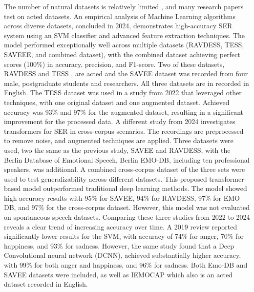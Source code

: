 The number of natural datasets is relatively limited \autocite{Cai2023}, and many research papers test on acted datasets. An empirical analysis \autocite{Ahammed2024} of Machine Learning algorithms across diverse datasets, concluded in 2024, demonstrates high-accuracy SER system using an SVM classifier and advanced feature extraction techniques. The model performed exceptionally well across multiple datasets (RAVDESS, TESS, SAVEEE, and combined dataset), with the combined dataset achieving perfect scores (100\%) in accuracy, precision, and F1-score. Two of these datasets, RAVDESS \autocite{StevenRLivingstone2019} and TESS \autocite{Pichora-Fuller2020}, are acted and the SAVEE \autocite{kaggle-savee} dataset was recorded from four male, postgraduate students and researchers. All three datasets are in recorded in English. 
The TESS dataset was used in a study from 2022 \autocite{Praseetha2022} that leveraged other techniques, with one original dataset and one augmented dataset. Achieved accuracy was 93\% and 97\% for the augmented dataset, resulting in a significant improvement for the processed data.
A different study \autocite{Alroobaea2024} from 2024 investigates transformers for SER in cross-corpus scenarios. The recordings are preprocessed to remove noise, and augmented techniques are applied. Three datasets were used, two the same as the previous study, SAVEE and RAVDESS, with the Berlin Database of Emotional Speech, Berlin EMO-DB, including ten professional speakers, was additional. A combined cross-corpus dataset of the three sets were used to test generalizability across different datasets. This proposed transformer-based model outperformed traditional deep learning methods. The model showed high accuracy results with 95\% for SAVEE, 94\% for RAVDESS, 97\% for EMO-DB, and 97\% for the cross-corpus dataset. However, this model was not evaluated on spontaneous speech datasets.
Comparing these three studies from 2022 to 2024 reveals a clear trend of increasing accuracy over time. A 2019 review \autocite{Khalil2019} reported significantly lower results for the SVM, with accuracy of 74\% for anger, 70\% for happiness, and 93\% for sadness. However, the same study found that a Deep Convolutional neural network (DCNN), achieved substantially higher accuracy, with 99\% for both anger and happiness, and 96\% for sadness. Both Emo-DB and SAVEE datasets were included, as well as IEMOCAP which also is an acted dataset recorded in English.

